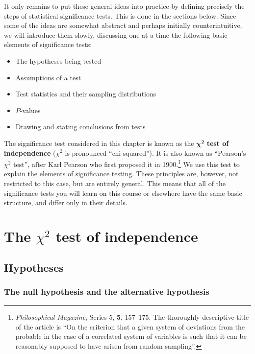 It only remains to put these general ideas into practice by
defining precisely the steps of statistical
significance tests. This is done in the sections below. Since some of
the ideas are somewhat abstract and perhaps initially
counterintuitive, we will introduce them slowly, discussing one at a
time the following basic elements of significance tests:
\begin{itemize}
\item
The hypotheses being tested
\item
Assumptions of a test
\item
Test statistics and their sampling distributions
\item
$P$-values
\item
Drawing and stating conclusions from tests
\end{itemize}
The significance test considered in this chapter is known as the
$\boldsymbol{\chi^{2}}$ \textbf{test of independence} ($\chi^{2}$ is
pronounced ``chi-squared''). It is also known as ``Pearson's
$\chi^{2}$ test'', after Karl Pearson who first proposed it in 1900.\footnote{
\emph{Philosophical Magazine}, Series 5, \textbf{5}, 157--175.
\label{p_pearson} The thoroughly descriptive title of the article is
``On the criterion
that a given system of deviations from the probable in the case of a
correlated system of variables is such that it can be reasonably
supposed to have arisen from random sampling''.
}
We use this test to explain the elements of
significance testing. These principles are, however, not restricted to
this case, but are entirely general. This means that all of the
significance tests you will learn on this course or elsewhere have the
same basic structure, and differ only in their details.


\section{The $\chi^{2}$ test of independence}
\label{s_tables_chi2test}

\subsection{Hypotheses}
\label{ss_tables_chi2test_null}

\subsubsection{The null hypothesis and the alternative hypothesis}

